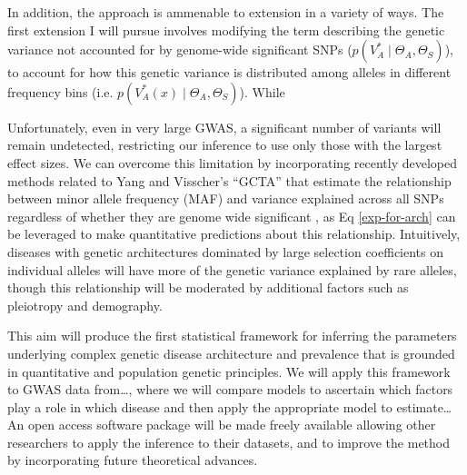 \message{ !name(ResearchStrategy.tex)}\documentclass[11pt]{article}
\begin{document}
In addition, the approach is ammenable to extension in a variety of ways. The first extension I will pursue involves modifying the term describing the genetic variance not accounted for by genome-wide significant SNPs ($p\left(V_A^* \mid \Theta_A , \Theta_S\right)$), to account for how this genetic variance is distributed among alleles in different frequency bins (i.e. $p\left(V_A^*\left(x\right) \mid \Theta_A , \Theta_S\right)$). While  


Unfortunately, even in very large GWAS, a significant number of variants will remain undetected, restricting our inference to use only those with the largest effect sizes. We can overcome this limitation by incorporating recently developed methods related to Yang and Visscher's ``GCTA''\cite{Yang:2011hd} that estimate the relationship between minor allele frequency (MAF) and variance explained across all SNPs regardless of whether they are genome wide significant \cite{Speed:2017ec, Evans:2017ce}, as Eq \eqref{exp-for-arch} can be leveraged to make quantitative predictions about this relationship. Intuitively, diseases with genetic architectures dominated by large selection coefficients on individual alleles will have more of the genetic variance explained by rare alleles, though this relationship will be moderated by additional factors such as pleiotropy and demography.


This aim will produce the first statistical framework for inferring the parameters underlying complex genetic disease architecture and prevalence that is grounded in quantitative and population genetic principles. We will apply this framework to GWAS data from…, where we will compare models to ascertain which factors play a role in which disease and then apply the appropriate model to estimate… An open access software package will be made freely available allowing other researchers to apply the inference to their datasets, and to improve the method by incorporating future theoretical advances.



\end{document}

